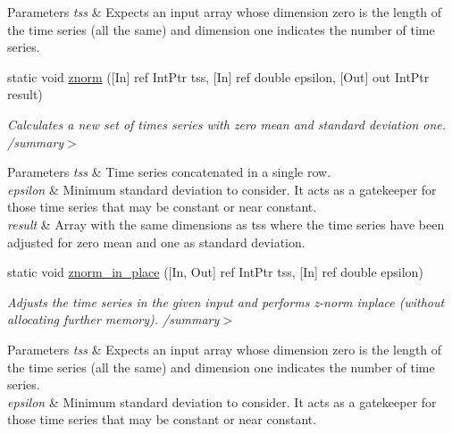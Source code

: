 \begin{DoxyCompactItemize}
\begin{DoxyCompactList}
\begin{DoxyParams}{Parameters}
{\em tss} & Expects an input array whose dimension zero is the length of the time series (all the same) and dimension one indicates the number of time series.\\
\hline
\end{DoxyParams}
\end{DoxyCompactList}\item 
static void \mbox{\hyperlink{classkhiva_1_1interop_1_1_d_l_l_normalization_af64a7d51d051bc5d9259a3b5ea7c9900}{znorm}} (\mbox{[}In\mbox{]} ref Int\+Ptr tss, \mbox{[}In\mbox{]} ref double epsilon, \mbox{[}Out\mbox{]} out Int\+Ptr result)
\begin{DoxyCompactList}\small\item\em Calculates a new set of times series with zero mean and standard deviation one. /summary$>$ 
\begin{DoxyParams}{Parameters}
{\em tss} & Time series concatenated in a single row.\\
\hline
{\em epsilon} & Minimum standard deviation to consider. It acts as a gatekeeper for those time series that may be constant or near constant.\\
\hline
{\em result} & Array with the same dimensions as tss where the time series have been adjusted for zero mean and one as standard deviation.\\
\hline
\end{DoxyParams}
\end{DoxyCompactList}\item 
static void \mbox{\hyperlink{classkhiva_1_1interop_1_1_d_l_l_normalization_ae58535dd3096b81e75973ec26c388486}{znorm\+\_\+in\+\_\+place}} (\mbox{[}In, Out\mbox{]} ref Int\+Ptr tss, \mbox{[}In\mbox{]} ref double epsilon)
\begin{DoxyCompactList}\small\item\em Adjusts the time series in the given input and performs z-\/norm inplace (without allocating further memory). /summary$>$ 
\begin{DoxyParams}{Parameters}
{\em tss} & Expects an input array whose dimension zero is the length of the time series (all the same) and dimension one indicates the number of time series.\\
\hline
{\em epsilon} & Minimum standard deviation to consider. It acts as a gatekeeper for those time series that may be constant or near constant.\\
\hline
\end{DoxyParams}
\end{DoxyCompactList}\end{DoxyCompactItemize}


